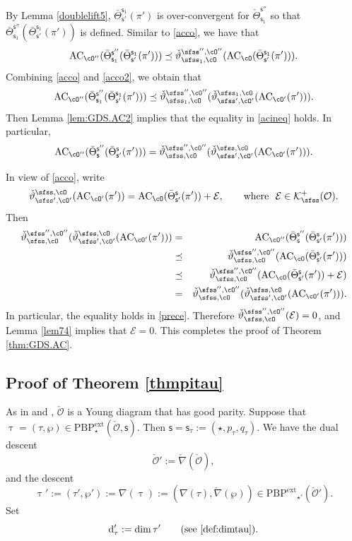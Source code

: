 \documentclass[11pt,a4paper]{amsart}
\newcommand{\CE}{{\mathcal {E}}}
\newcommand{\CK}{{\mathcal {K}}}
\newcommand{\CO}{{\mathcal {O}}}
\def\DD{\nabla}
\newcommand{\be}{\begin {equation}}
\newcommand{\ee}{\end {equation}}
\numberwithin{equation}{section}
\theoremstyle{remark}
\def\Thetab{\bar{\Theta}}
\def\PBPe{\mathrm{PBP}^{\mathrm{ext}}}
\def\ckDD{{\check\DD}}
\begin{document}
By Lemma \ref{doublelift5},  $ \Thetab_{\mathsf s'}^{\mathsf s_1}(\pi')$ is over-convergent for $ \check \Theta_{\mathsf s_1}^{\mathsf s''}$ so that $\Thetab_{\mathsf s_1}^{\mathsf s''}( \Thetab_{\mathsf s'}^{\mathsf s_1}(\pi'))$ is defined.  Similar to \eqref{acco}, we have that
   \be\label{acco2}
   \mathrm{AC}_{\cO''}( \Thetab_{\mathsf s_1}^{\mathsf s''}(\Thetab_{\mathsf s'}^{\mathsf s_1}(\pi')))\preceq   \check \vartheta_{\sfss_1, \cO}^{\sfss'', \cO''}(\mathrm{AC}_{\cO}( \Thetab_{\mathsf s'}^{\mathsf s_1}(\pi'))).
  \ee
Combining \eqref{acco} and \eqref{acco2}, we obtain that
\be\label{acineq}
   \mathrm{AC}_{\cO''}( \Thetab_{\mathsf s_1}^{\mathsf s''}(\Thetab_{\mathsf s'}^{\mathsf s_1}(\pi')))\preceq   \check \vartheta_{\sfss_1, \cO}^{\sfss'', \cO''}(\check \vartheta_{\sfss', \cO'}^{\sfss_1, \cO}(\mathrm{AC}_{\cO'}(\pi'))).
\ee
Then Lemma \ref{lem:GDS.AC2} implies that the equality in \eqref{acineq} holds. In particular,
\be\label{acineq2}
   \mathrm{AC}_{\cO''}( \Thetab_{\mathsf s}^{\mathsf s''}(\Thetab_{\mathsf s'}^{\mathsf s}(\pi')))=  \check \vartheta_{\sfss, \cO}^{\sfss'', \cO''}(\check \vartheta_{\sfss', \cO'}^{\sfss, \cO}(\mathrm{AC}_{\cO'}(\pi'))).
\ee

In view of \eqref{acco}, write
\[
  \check \vartheta_{\sfss', \cO'}^{\sfss, \cO}(\mathrm{AC}_{\cO'}(\pi'))=\mathrm{AC}_{\cO}( \Thetab_{\mathsf s'}^{\mathsf s}(\pi'))+\CE,\qquad\textrm{where $\ \CE\in \CK^+_\sfss(\CO)$}.
\]
Then
\begin{eqnarray}
\nonumber \check \vartheta_{\sfss, \cO}^{\sfss'', \cO''}(\check \vartheta_{\sfss', \cO'}^{\sfss, \cO}(\mathrm{AC}_{\cO'}(\pi')))
\nonumber &=&\mathrm{AC}_{\cO''}( \Thetab_{\mathsf s}^{\mathsf s''}(\Thetab_{\mathsf s'}^{\mathsf s}(\pi')))\\
\nonumber &\preceq &  \check \vartheta_{\sfss, \cO}^{\sfss'', \cO''}(\mathrm{AC}_{\cO}( \Thetab_{\mathsf s'}^{\mathsf s}(\pi')))\\
\label{prece}  &\preceq &  \check \vartheta_{\sfss, \cO}^{\sfss'', \cO''}(\mathrm{AC}_{\cO}( \Thetab_{\mathsf s'}^{\mathsf s}(\pi'))+\CE)\\
\nonumber &=&\check \vartheta_{\sfss, \cO}^{\sfss'', \cO''}(\check \vartheta_{\sfss', \cO'}^{\sfss, \cO}(\mathrm{AC}_{\cO'}(\pi'))).
\end{eqnarray}
In particular,  the equality holds in \eqref{prece}. Therefore  $\check \vartheta_{\sfss, \cO}^{\sfss'', \cO''}(\CE)=0$, and
Lemma \ref{lem74} implies that $\CE=0$. This completes the proof of Theorem \ref{thm:GDS.AC}. 


 \subsection{Proof of Theorem \ref{thmpitau} }\label{sec:comANDgeo}
  As in  and , 
  $\check \CO$ is a Young diagram that has good parity. Suppose that
$\uptau=(\tau, \wp)\in \PBPe_\star(\check \CO,\mathsf s)$. Then $\mathsf s =\mathsf s_{\tau}:=(\star, p_\tau, q_\tau)$. We have the dual descent
\[
  \check \CO':=\check \nabla(\check \CO),
\]
and the descent
 \[
  \uptau' := (\tau',\wp'):=\nabla(\uptau):= (\DD(\tau), \ckDD(\wp))\in \mathrm{\PBPe}_{\star'}(\check \CO').
 \]
 Set
 \[
  \mathrm d'_\tau:=
    \dim \tau' \qquad (\text{see \eqref{def:dimtau}}).
    \]
\end{document}
